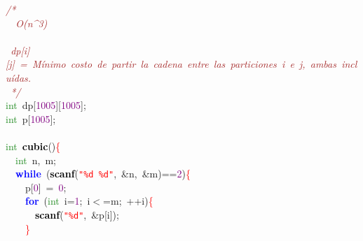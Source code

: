
{\ttfamily \raggedright {
\noindent
\mbox{}\textit{\textcolor{Brown}{/*}} \\
\mbox{}\textit{\textcolor{Brown}{\ \ O(n\textasciicircum{}3)}} \\
\mbox{} \\
\mbox{}\textit{\textcolor{Brown}{\ dp[i][j]\ =\ Mínimo\ costo\ de\ partir\ la\ cadena\ entre\ las\ particiones\ i\ e\ j,\ ambas\ incluídas.}} \\
\mbox{}\textit{\textcolor{Brown}{\ */}} \\
\mbox{}\textcolor{ForestGreen}{int}\ dp\textcolor{BrickRed}{[}\textcolor{Purple}{1005}\textcolor{BrickRed}{][}\textcolor{Purple}{1005}\textcolor{BrickRed}{];} \\
\mbox{}\textcolor{ForestGreen}{int}\ p\textcolor{BrickRed}{[}\textcolor{Purple}{1005}\textcolor{BrickRed}{];} \\
\mbox{} \\
\mbox{}\textcolor{ForestGreen}{int}\ \textbf{\textcolor{Black}{cubic}}\textcolor{BrickRed}{()}\textcolor{Red}{\{} \\
\mbox{}\ \ \textcolor{ForestGreen}{int}\ n\textcolor{BrickRed}{,}\ m\textcolor{BrickRed}{;} \\
\mbox{}\ \ \textbf{\textcolor{Blue}{while}}\ \textcolor{BrickRed}{(}\textbf{\textcolor{Black}{scanf}}\textcolor{BrickRed}{(}\texttt{\textcolor{Red}{"{}\%d\ \%d"{}}}\textcolor{BrickRed}{,}\ \textcolor{BrickRed}{\&}n\textcolor{BrickRed}{,}\ \textcolor{BrickRed}{\&}m\textcolor{BrickRed}{)==}\textcolor{Purple}{2}\textcolor{BrickRed}{)}\textcolor{Red}{\{} \\
\mbox{}\ \ \ \ p\textcolor{BrickRed}{[}\textcolor{Purple}{0}\textcolor{BrickRed}{]}\ \textcolor{BrickRed}{=}\ \textcolor{Purple}{0}\textcolor{BrickRed}{;} \\
\mbox{}\ \ \ \ \textbf{\textcolor{Blue}{for}}\ \textcolor{BrickRed}{(}\textcolor{ForestGreen}{int}\ i\textcolor{BrickRed}{=}\textcolor{Purple}{1}\textcolor{BrickRed}{;}\ i\textcolor{BrickRed}{$<$=}m\textcolor{BrickRed}{;}\ \textcolor{BrickRed}{++}i\textcolor{BrickRed}{)}\textcolor{Red}{\{} \\
\mbox{}\ \ \ \ \ \ \textbf{\textcolor{Black}{scanf}}\textcolor{BrickRed}{(}\texttt{\textcolor{Red}{"{}\%d"{}}}\textcolor{BrickRed}{,}\ \textcolor{BrickRed}{\&}p\textcolor{BrickRed}{[}i\textcolor{BrickRed}{]);} \\
\mbox{}\ \ \ \ \textcolor{Red}{\}} \\
}}
